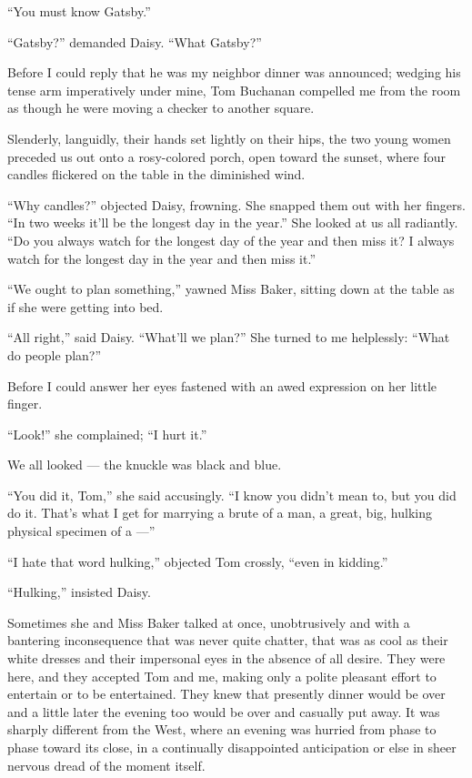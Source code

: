 \documentclass{znotebook}
\begin{document}
``You must know Gatsby.''

``Gatsby?'' demanded Daisy. ``What Gatsby?''

Before I could reply that he was my neighbor dinner was announced; wedging his tense arm imperatively under mine, Tom Buchanan compelled me from the room as though he were moving a checker to another square.

Slenderly, languidly, their hands set lightly on their hips, the two young women preceded us out onto a rosy-colored porch, open toward the sunset, where four candles flickered on the table in the diminished wind.

``Why candles?'' objected Daisy, frowning. She snapped them out with her fingers. ``In two weeks it'll be the longest day in the year.'' She looked at us all radiantly. ``Do you always watch for the longest day of the year and then miss it? I always watch for the longest day in the year and then miss it.''

``We ought to plan something,'' yawned Miss Baker, sitting down at the table as if she were getting into bed.

``All right,'' said Daisy. ``What'll we plan?'' She turned to me helplessly: ``What do people plan?''

Before I could answer her eyes fastened with an awed expression on her little finger.

``Look!'' she complained; ``I hurt it.''

We all looked ---{} the knuckle was black and blue.

``You did it, Tom,'' she said accusingly. ``I know you didn't mean to, but you did do it. That's what I get for marrying a brute of a man, a great, big, hulking physical specimen of a ---''

``I hate that word hulking,'' objected Tom crossly, ``even in kidding.''

``Hulking,'' insisted Daisy.

Sometimes she and Miss Baker talked at once, unobtrusively and with a bantering inconsequence that was never quite chatter, that was as cool as their white dresses and their impersonal eyes in the absence of all desire. They were here, and they accepted Tom and me, making only a polite pleasant effort to entertain or to be entertained. They knew that presently dinner would be over and a little later the evening too would be over and casually put away. It was sharply different from the West, where an evening was hurried from phase to phase toward its close, in a continually disappointed anticipation or else in sheer nervous dread of the moment itself.
\end{document}
